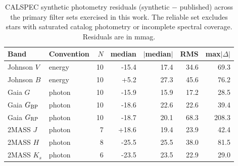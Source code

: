 \begin{table}
\centering
\caption{CALSPEC synthetic photometry residuals (synthetic $-$ published) across the primary filter sets exercised in this work. The reliable set excludes stars with saturated catalog photometry or incomplete spectral coverage. Residuals are in mmag.}
\label{tab:calspec_residuals}
\begin{tabular}{llrrrrr}
\hline\hline
Band & Convention & $N$ & median & $|$median$|$ & RMS & max$|\Delta|$ \\
\hline
Johnson $V$ & energy & 10 & -15.4 & 17.4 & 34.6 & 69.3 \\
Johnson $B$ & energy & 10 & +5.2 & 27.3 & 45.6 & 76.2 \\
Gaia $G$ & photon & 10 & -15.9 & 15.9 & 17.2 & 28.5 \\
Gaia $G_{\rm BP}$ & photon & 10 & -18.6 & 22.6 & 22.6 & 39.4 \\
Gaia $G_{\rm RP}$ & photon & 10 & -18.7 & 20.1 & 68.3 & 208.3 \\
2MASS $J$ & photon & 7 & +18.6 & 19.4 & 23.9 & 42.4 \\
2MASS $H$ & photon & 8 & -25.5 & 25.5 & 38.0 & 81.5 \\
2MASS $K_s$ & photon & 6 & -23.5 & 23.5 & 22.9 & 29.0 \\
\hline
\end{tabular}
\end{table}
